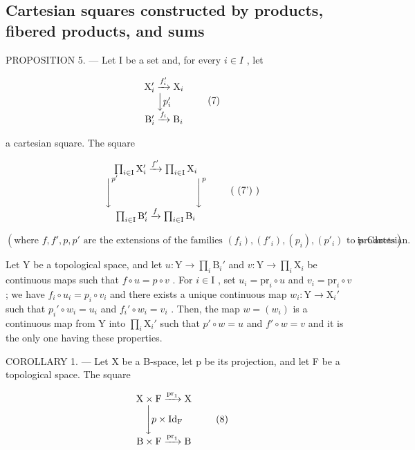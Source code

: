 \subsection{Cartesian squares constructed by products, fibered products, and sums}

PROPOSITION 5. --- Let I be a set and, for every \(i \in I\) , let

\[
\begin{array}{c} \mathrm{X} _ {i} ^ {\prime} \xrightarrow {f _ {i} ^ {\prime}} \mathrm{X} _ {i} \\ \Big \downarrow p _ {i} ^ {\prime} \\ \mathrm{B} _ {i} ^ {\prime} \xrightarrow {f _ {i}} \mathrm{B} _ {i} \end{array}\tag{7}
\]

a cartesian square. The square

\[
\begin{array}{c} \prod_ {i \in \mathrm{I}} \mathrm{X} _ {i} ^ {\prime} \xrightarrow {f ^ {\prime}} \prod_ {i \in \mathrm{I}} \mathrm{X} _ {i} \\ \Biggl \downarrow^ {p ^ {\prime}} \qquad \qquad \qquad \qquad \Biggl \downarrow^ {p} \\ \prod_ {i \in \mathrm{I}} \mathrm{B} _ {i} ^ {\prime} \xrightarrow {f} \prod_ {i \in \mathrm{I}} \mathrm{B} _ {i} \end{array}\tag{ (7') }
\]

\((\text{where } f, f', p, p' \text{ are the extensions of the families } (f_i), (f'_i), (p_i), (p'_i) \text{ to products}) \text{ is Cartesian.}\)

Let Y be a topological space, and let \(u \colon \mathrm{Y} \to \prod_{i} \mathrm{B}_{i}'\) and \(v \colon \mathrm{Y} \to \prod_{i} \mathrm{X}_{i}\) be continuous maps such that \(f \circ u = p \circ v\) . For \(i \in \mathrm{I}\) , set \(u_{i} = \mathrm{pr}_{i} \circ u\) and \(v_{i} = \mathrm{pr}_{i} \circ v\) ; we have \(f_{i} \circ u_{i} = p_{i} \circ v_{i}\) and there exists a unique continuous map \(w_{i} \colon \mathrm{Y} \to \mathrm{X}_{i}'\) such that \(p_{i}' \circ w_{i} = u_{i}\) and \(f_{i}' \circ w_{i} = v_{i}\) . Then, the map \(w = (w_{i})\) is a continuous map from Y into \(\prod_{i} \mathrm{X}_{i}'\) such that \(p' \circ w = u\) and \(f' \circ w = v\) and it is the only one having these properties.

COROLLARY 1. --- Let X be a B-space, let p be its projection, and let F be a topological space. The square

\[
\begin{array}{c} \mathrm{X} \times \mathrm{F} \xrightarrow {\operatorname{pr} _ {1}} \mathrm{X} \\ \Biggl \downarrow p \times \mathrm{Id} _ {\mathrm{F}} \\ \mathrm{B} \times \mathrm{F} \xrightarrow {\operatorname{pr} _ {1}} \mathrm{B} \end{array}\tag{8}
\]

